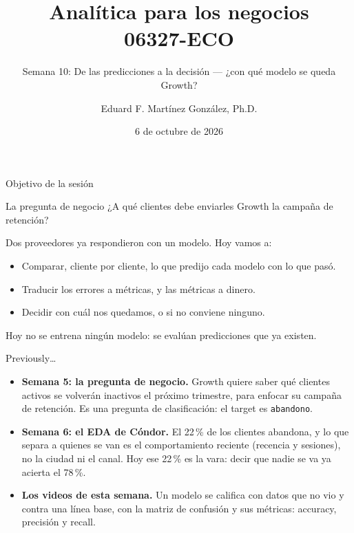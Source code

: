 \documentclass{beamer}
\title[06327-ECO]{Analítica para los negocios \\ 06327-ECO}
\subtitle{Semana 10: De las predicciones a la decisión --- ¿con qué modelo se queda Growth?}
\author{Eduard F. Martínez González, Ph.D.}
\institute[]{Departamento de Economía, Universidad Icesi}
\date{6 de octubre de 2026}
\begin{document}
\begin{frame}
\titlepage
\end{frame}

\begin{frame}{Objetivo de la sesión}
\small
\begin{block}{La pregunta de negocio}
¿A qué clientes debe enviarles Growth la campaña de retención?
\end{block}

\vspace{0.2cm}
Dos proveedores ya respondieron con un modelo. Hoy vamos a:
\begin{itemize} \setlength{\itemsep}{0.15cm}
  \item Comparar, cliente por cliente, lo que predijo cada modelo con lo que pasó.
  \item Traducir los errores a métricas, y las métricas a dinero.
  \item Decidir con cuál nos quedamos, o si no conviene ninguno.
\end{itemize}

\vspace{0.25cm}
\textcolor{azulcaso}{Hoy no se entrena ningún modelo: se evalúan predicciones que ya existen.}
\end{frame}

\begin{frame}{Previously\ldots}
\small
\begin{itemize} \setlength{\itemsep}{0.25cm}
  \item \textbf{Semana 5: la pregunta de negocio.} Growth quiere saber qué clientes activos se volverán inactivos el próximo trimestre, para enfocar su campaña de retención. Es una pregunta de clasificación: el target es \texttt{abandono}.
  \item \textbf{Semana 6: el EDA de Cóndor.} El 22\,\% de los clientes abandona, y lo que separa a quienes se van es el comportamiento reciente (recencia y sesiones), no la ciudad ni el canal. Hoy ese 22\,\% es la vara: decir que nadie se va ya acierta el 78\,\%.
  \item \textbf{Los videos de esta semana.} Un modelo se califica con datos que no vio y contra una línea base, con la matriz de confusión y sus métricas: accuracy, precisión y recall.
\end{itemize}
\end{frame}
\end{document}
